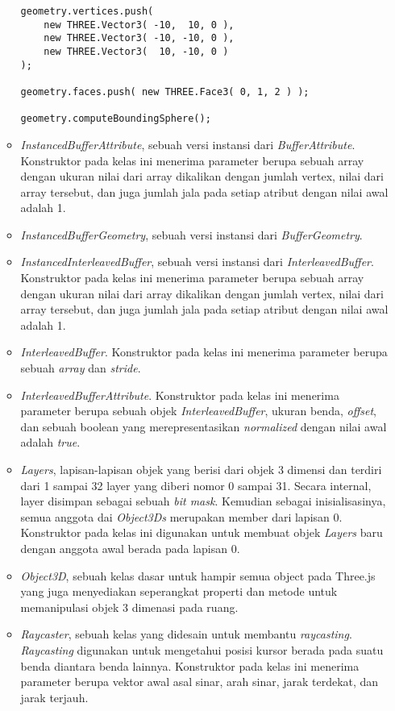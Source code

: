 \begin{itemize}
\begin{itemize}
\begin{lstlisting}[caption={Contoh instansiasi kelas {\it Geometry}.},captionpos=b]
geometry.vertices.push(
	new THREE.Vector3( -10,  10, 0 ),
	new THREE.Vector3( -10, -10, 0 ),
	new THREE.Vector3(  10, -10, 0 )
);

geometry.faces.push( new THREE.Face3( 0, 1, 2 ) );

geometry.computeBoundingSphere();
\end{lstlisting}

	\item{\it InstancedBufferAttribute}, sebuah versi instansi dari {\it BufferAttribute}. Konstruktor pada kelas ini menerima parameter berupa sebuah array dengan ukuran nilai dari array dikalikan dengan jumlah vertex, nilai dari array tersebut, dan juga jumlah jala pada setiap atribut dengan nilai awal adalah 1.
	
	\item{\it InstancedBufferGeometry}, sebuah versi instansi dari {\it BufferGeometry}.
	
	\item{\it InstancedInterleavedBuffer}, sebuah versi instansi dari {\it InterleavedBuffer}. Konstruktor pada kelas ini menerima parameter berupa sebuah array dengan ukuran nilai dari array dikalikan dengan jumlah vertex, nilai dari array tersebut, dan juga jumlah jala pada setiap atribut dengan nilai awal adalah 1.
	
	\item{\it InterleavedBuffer}. Konstruktor pada kelas ini menerima parameter berupa sebuah {\it array} dan {\it stride}.
	
	\item{\it InterleavedBufferAttribute}. Konstruktor pada kelas ini menerima parameter berupa sebuah objek {\it InterleavedBuffer}, ukuran benda, {\it offset}, dan sebuah boolean yang merepresentasikan {\it normalized} dengan nilai awal adalah {\it true}.
	
	\item{\it Layers}, lapisan-lapisan objek yang berisi dari objek 3 dimensi dan terdiri dari 1 sampai 32 layer yang diberi nomor 0 sampai 31. Secara internal, layer disimpan sebagai sebuah {\it bit mask}. Kemudian sebagai inisialisasinya, semua anggota dai {\it Object3Ds} merupakan member dari lapisan 0. Konstruktor pada kelas ini digunakan untuk membuat objek {\it Layers} baru dengan anggota awal berada pada lapisan 0.
	\item{\it Object3D}, sebuah kelas dasar untuk hampir semua object pada Three.js yang juga menyediakan seperangkat properti dan metode untuk memanipulasi objek 3 dimenasi pada ruang.
	\item{\it Raycaster}, sebuah kelas yang didesain untuk membantu {\it raycasting}. {\it Raycasting} digunakan untuk mengetahui posisi kursor berada pada suatu benda diantara benda lainnya. Konstruktor pada kelas ini menerima parameter berupa vektor awal asal sinar, arah sinar, jarak terdekat, dan jarak terjauh. 
	

\end{itemize}
\end{itemize}
